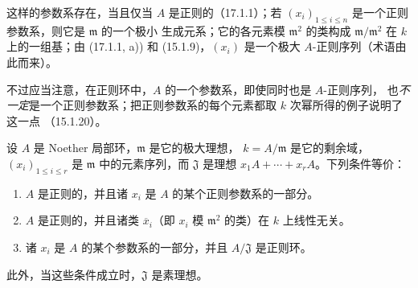 这样的参数系存在，当且仅当 $A$ 是正则的（17.1.1）；若
$(x_i)_{1\leq i\leq n}$ 是一个正则参数系，则它是 $\mathfrak{m}$ 的一个极小
生成元系；它的各元素模 $\mathfrak{m}^2$ 的类构成 $\mathfrak{m}/\mathfrak{m}^2$
在 $k$ 上的一组基；由 (17.1.1, a)) 和 (15.1.9)，$(x_i)$ 是一个极大
$A$-正则序列（术语由此而来）。

不过应当注意，在正则环中，$A$ 的一个参数系，即使同时也是 $A$-正则序列，
也\emph{不一定}是一个正则参数系；把正则参数系的每个元素都取 $k$ 次幂所得的例子说明了这一点
（15.1.20）。

\begin{proposition}[17.1.7]
\label{0.17.1.7-fr}
设 $A$ 是 Noether 局部环，$\mathfrak{m}$ 是它的极大理想，
$k=A/\mathfrak{m}$ 是它的剩余域，$(x_i)_{1\leq i\leq r}$ 是
$\mathfrak{m}$ 中的元素序列，而 $\mathfrak{J}$ 是理想
$x_1A+\cdots+x_rA$。下列条件等价：
\begin{enumerate}
  \item[\rm a)] $A$ 是正则的，并且诸 $x_i$ 是 $A$ 的某个正则参数系的一部分。
  \item[\rm a')] $A$ 是正则的，并且诸类 $\overline{x}_i$（即 $x_i$ 模
  $\mathfrak{m}^2$ 的类）在 $k$ 上线性无关。
  \item[\rm b)] 诸 $x_i$ 是 $A$ 的某个参数系的一部分，并且 $A/\mathfrak{J}$
  是正则环。
\end{enumerate}
此外，当这些条件成立时，$\mathfrak{J}$ 是素理想。
\end{proposition}


